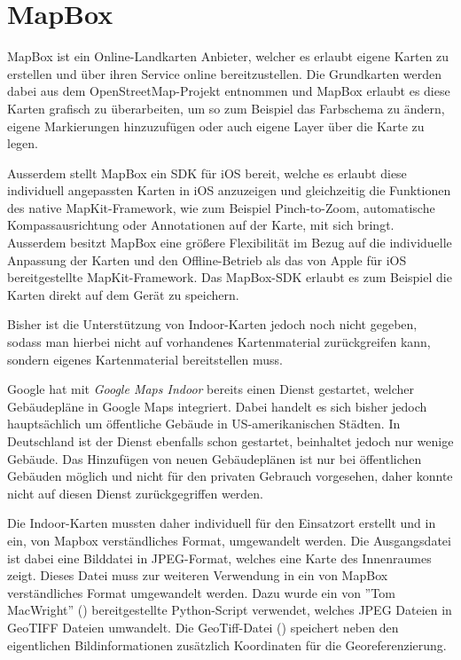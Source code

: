 \section{MapBox}
\label{sec:sec:technologies:mapbox}
MapBox ist ein Online-Landkarten Anbieter, welcher es erlaubt eigene Karten zu erstellen und über ihren Service online bereitzustellen. 
Die Grundkarten werden dabei aus dem OpenStreetMap-Projekt entnommen und MapBox erlaubt es diese Karten grafisch zu überarbeiten, um so zum Beispiel das Farbschema zu ändern, eigene Markierungen hinzuzufügen oder auch eigene Layer über die Karte zu legen.

Ausserdem stellt MapBox ein SDK für iOS bereit, welche es erlaubt diese individuell angepassten Karten in iOS anzuzeigen und gleichzeitig die Funktionen des native MapKit-Framework, wie zum Beispiel Pinch-to-Zoom, automatische Kompassausrichtung oder Annotationen auf der Karte, mit sich bringt. Ausserdem besitzt MapBox eine größere Flexibilität im Bezug auf die individuelle Anpassung der Karten und den Offline-Betrieb als das von Apple für iOS bereitgestellte MapKit-Framework. Das MapBox-SDK erlaubt es zum Beispiel die Karten direkt auf dem Gerät zu speichern.

Bisher ist die Unterstützung von Indoor-Karten jedoch noch nicht gegeben, sodass man hierbei nicht auf vorhandenes Kartenmaterial zurückgreifen kann, sondern eigenes Kartenmaterial bereitstellen muss.

Google hat mit \emph{Google Maps Indoor} bereits einen Dienst gestartet, welcher Gebäudepläne in Google Maps integriert. Dabei handelt es sich bisher jedoch hauptsächlich um öffentliche Gebäude in US-amerikanischen Städten. In Deutschland ist der Dienst ebenfalls schon gestartet, beinhaltet jedoch nur wenige Gebäude. Das Hinzufügen von neuen Gebäudeplänen ist nur bei öffentlichen Gebäuden möglich und nicht für den privaten Gebrauch vorgesehen, daher konnte nicht auf diesen Dienst zurückgegriffen werden.

Die Indoor-Karten mussten daher individuell für den Einsatzort erstellt und in ein, von Mapbox verständliches Format, umgewandelt werden.
Die Ausgangsdatei ist dabei eine Bilddatei in JPEG-Format, welches eine Karte des Innenraumes zeigt. Dieses Datei muss zur weiteren Verwendung in ein von MapBox verständliches Format umgewandelt werden. 
Dazu wurde ein von ''Tom MacWright'' (\citet{jpgtogeo}) bereitgestellte Python-Script verwendet, welches JPEG Dateien in GeoTIFF Dateien umwandelt. Die GeoTiff-Datei (\citet{geotiff}) speichert neben den eigentlichen Bildinformationen zusätzlich Koordinaten für die Georeferenzierung. 

